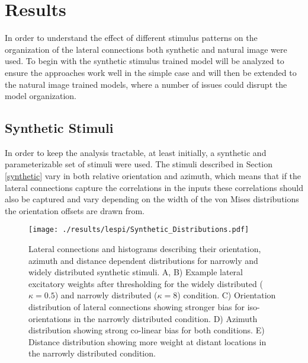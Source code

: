 \section{Results}

In order to understand the effect of different stimulus patterns on
the organization of the lateral connections both synthetic and natural
image were used. To begin with the synthetic stimulus trained model
will be analyzed to ensure the approaches work well in the simple case
and will then be extended to the natural image trained models, where a
number of issues could disrupt the model organization.

\subsection{Synthetic Stimuli}

In order to keep the analysis tractable, at least initially, a
synthetic and parameterizable set of stimuli were used. The stimuli
described in Section \ref{synthetic} vary in both relative orientation
and azimuth, which means that if the lateral connections capture the
correlations in the inputs these correlations should also be captured
and vary depending on the width of the von Mises distributions the
orientation offsets are drawn from.

\begin{figure}
	\centering
    \texttt{[image: ./results/lespi/Synthetic\_Distributions.pdf]}
	\caption[Distributions of lateral connections of models trained on
      synthetic stimuli]{Lateral connections and histograms describing
      their orientation, azimuth and distance dependent distributions
      for narrowly and widely distributed synthetic stimuli. A, B)
      Example lateral excitatory weights after thresholding for the
      widely distributed ($\kappa=0.5$) and narrowly distributed
      ($\kappa=8$) condition. C) Orientation distribution of lateral
      connections showing stronger bias for iso-orientations in the
      narrowly distributed condition. D) Azimuth distribution showing
      strong co-linear bias for both conditions. E) Distance
      distribution showing more weight at distant locations in the
      narrowly distributed condition.}
	\label{SyntheticDistributions}
\end{figure}


